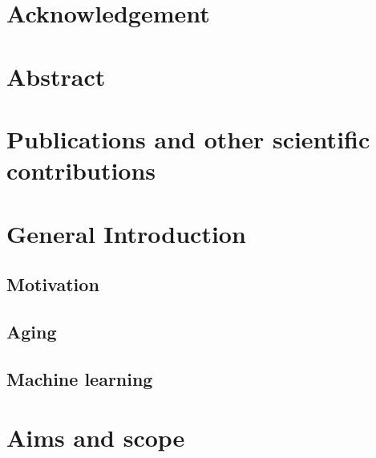 \documentclass[oneside]{book}
\begin{document}

\tableofcontents
\chapter*{Acknowledgement}



\chapter*{Abstract}
\setcounter{page}{2}



\listoffigures
{}


\listoftables
{}

\printglossary[title={List of Abbreviations}]

\chapter*{Publications and other scientific contributions}


\chapter{General Introduction}\label{chap:intro}

    \section{Motivation}
    
    \label{motivation}

    \section{Aging}
    \label{theory:aging}
        
    
    \section{Machine learning}
    \label{theory:ml}
     
    
\chapter{Aims and scope}
\end{document}
